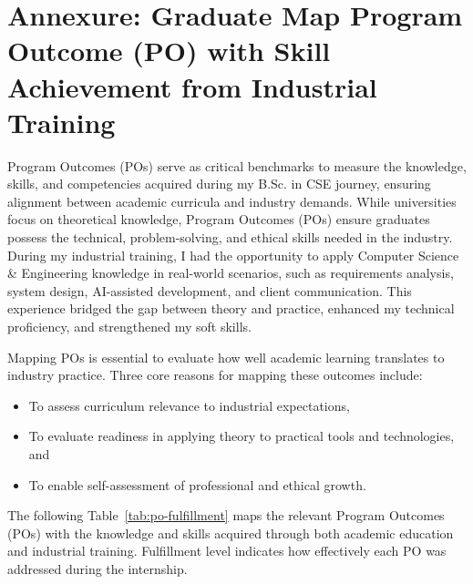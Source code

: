 \clearpage
\chapter*{Annexure: Graduate Map Program Outcome (PO) with Skill Achievement from Industrial Training}

\par Program Outcomes (POs) \cite{16} serve as critical benchmarks to measure the knowledge, skills, and competencies acquired during my B.Sc. in CSE journey, ensuring alignment between academic curricula and industry demands. While universities focus on theoretical knowledge, Program Outcomes (POs) ensure graduates possess the technical, problem-solving, and ethical skills needed in the industry. During my industrial training, I had the opportunity to apply Computer Science \& Engineering knowledge in real-world scenarios, such as requirements analysis, system design, AI-assisted development, and client communication. This experience bridged the gap between theory and practice, enhanced my technical proficiency, and strengthened my soft skills.

\par Mapping POs is essential to evaluate how well academic learning translates to industry practice. Three core reasons for mapping these outcomes include:
\begin{itemize}
    \item To assess curriculum relevance to industrial expectations,
    \item To evaluate readiness in applying theory to practical tools and technologies, and
    \item To enable self-assessment of professional and ethical growth.
\end{itemize}

\par The following Table~\ref{tab:po-fulfillment} maps the relevant Program Outcomes (POs) with the knowledge and skills acquired through both academic education and industrial training. Fulfillment level indicates how effectively each PO was addressed during the internship.

